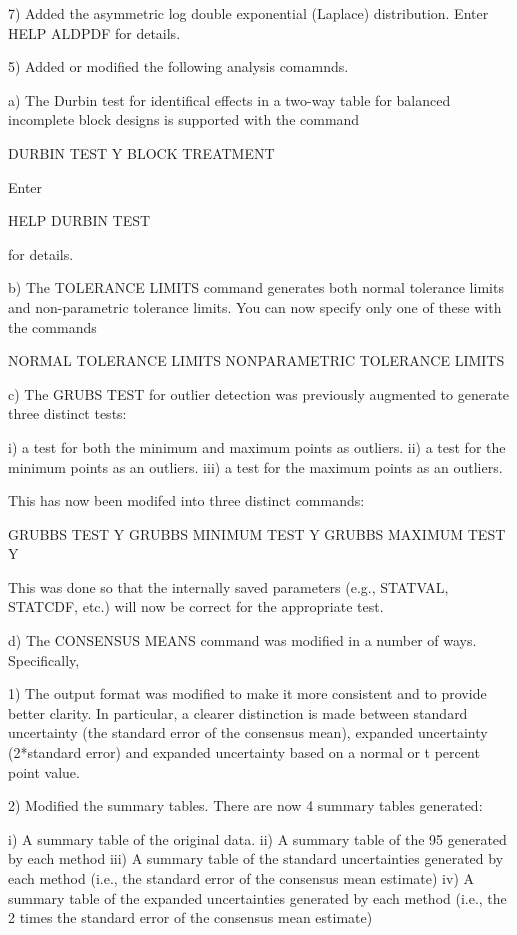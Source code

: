 {       7) Added the asymmetric log double exponential (Laplace)
          distribution.  Enter HELP ALDPDF for details.

 5) Added or modified the following analysis comamnds.

    a) The Durbin test for identifical effects in a two-way
       table for balanced incomplete block designs is supported
       with the command

          DURBIN TEST Y BLOCK TREATMENT

       Enter 

          HELP DURBIN TEST

       for details.

    b) The TOLERANCE LIMITS command generates both normal tolerance
       limits and non-parametric tolerance limits.  You can now
       specify only one of these with the commands

          NORMAL TOLERANCE LIMITS
          NONPARAMETRIC TOLERANCE LIMITS

    c) The GRUBS TEST for outlier detection was previously augmented
       to generate three distinct tests:

         i) a test for both the minimum and maximum points as
            outliers.
        ii) a test for the minimum points as an outliers.
       iii) a test for the maximum points as an outliers.

       This has now been modifed into three distinct commands:

          GRUBBS TEST Y
          GRUBBS MINIMUM TEST Y
          GRUBBS MAXIMUM TEST Y

       This was done so that the internally saved parameters
       (e.g., STATVAL, STATCDF, etc.) will now be correct for
       the appropriate test.
 
    d) The CONSENSUS MEANS command was modified in a number of
       ways.  Specifically,

       1) The output format was modified to make it more
          consistent and to provide better clarity.  In
          particular, a clearer distinction is made between
          standard uncertainty (the standard error of the
          consensus mean), expanded uncertainty (2*standard
          error) and expanded uncertainty based on a
          normal or t percent point value.

       2) Modified the summary tables.  There are now 4 summary
          tables generated:

             i) A summary table of the original data.
            ii) A summary table of the 95%
                generated by each method
           iii) A summary table of the standard uncertainties
                generated by each method (i.e., the standard
                error of the consensus mean estimate)
            iv) A summary table of the expanded uncertainties
                generated by each method (i.e., the 2 times
                the standard error of the consensus mean estimate)

}
